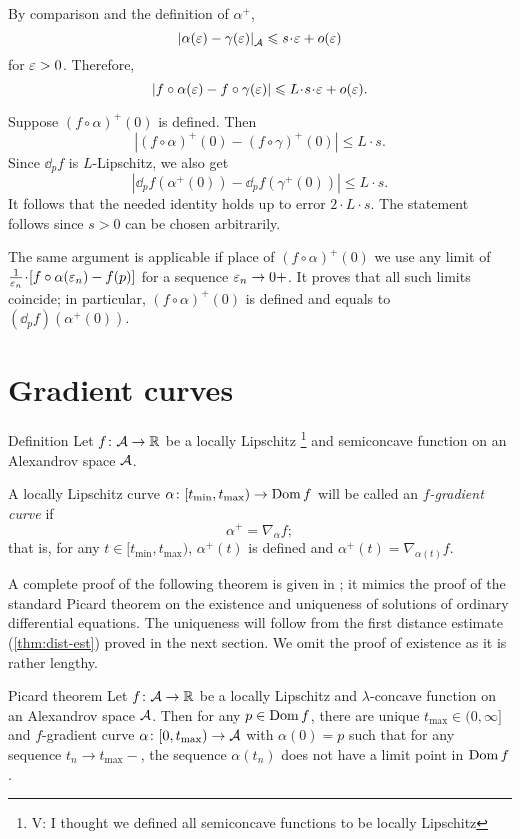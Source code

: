 By comparison and the definition of $\alpha^+$,
\[\dist{\alpha(\eps)}{\gamma(\eps)}{\spc{A}}\le s\cdot\eps+o(\eps)\]
for $\varepsilon>0$.
Therefore,
\[|f\circ\alpha(\eps)-f\circ\gamma(\eps)|\le L\cdot s\cdot\eps+o(\eps).\]

Suppose $(f\circ\alpha)^+(0)$ is defined.
Then
\[|(f\circ\alpha)^+(0)-(f\circ\gamma)^+(0)|\le L\cdot s.\]
Since $\dd_pf$ is $L$-Lipschitz, we also get 
\[|\dd_pf(\alpha^+(0))-\dd_pf(\gamma^+(0))|\le L\cdot s.\]
It follows that the needed identity holds up to error $2\cdot L\cdot s$.
The statement follows since $s>0$ can be chosen arbitrarily.

The same argument is applicable if place of $(f\circ\alpha)^+(0)$
we use any limit of $\tfrac1{\eps_n}\cdot [f\circ\alpha(\eps_n)-f(p)]$ for a sequence $\varepsilon_n\to 0+$.
It proves that all such limits coincide; in particular, $(f\circ\alpha)^+(0)$ is defined and equals to $(\dd_pf)(\alpha^+(0))$.
\qeds


\section{Gradient curves}

\begin{thm}{Definition}\label{def:grad-curve}
Let $f\colon\mathcal{A}\to\mathbb{R}$ be a locally Lipschitz \footnote{\red V: I thought we defined all semiconcave functions to be  locally Lipschitz } and semiconcave function on an Alexandrov space
$\mathcal{A}$.

A locally Lipschitz curve $\alpha\colon[t_{\min},t_{\max})\to\mathop{\rm Dom}\nolimits f$ will be called an \emph{$f$-gradient curve} if
\[\alpha^+=\nabla_{\alpha} f;\]
that is, for any $t\in[t_{\min},t_{\max})$, $\alpha^+(t)$ is defined and 
$\alpha^+(t)=\nabla_{\alpha(t)} f$.
\end{thm}

A complete proof of the following theorem is given in \cite{alexander-kapovitch-petrunin2024}; 
it mimics the proof of the standard Picard theorem on the existence  and uniqueness of solutions of ordinary differential equations.
The uniqueness will follow from the first distance estimate (\ref{thm:dist-est}) proved in the next section.
We omit the proof of existence as it is rather lengthy.

\begin{thm}{Picard theorem}\label{thm:glob-exist-grad-curv}
Let $f\colon\mathcal{A}\to \mathbb{R}$ be a locally Lipschitz and $\lambda$-concave function on an Alexandrov space $\mathcal{A}$.
Then for any $p\in \mathop{\rm Dom}\nolimits f$, there are unique $t_{\max}\in(0,\infty]$ and $f$-gradient curve $\alpha\colon[0,t_{\max})\to \mathcal{A}$ with $\alpha(0)=p$ such that for any sequence $t_n\to t_{\max}-$, the sequence $\alpha(t_n)$ does not have a limit point in $\mathop{\rm Dom}\nolimits f$.
\end{thm}

